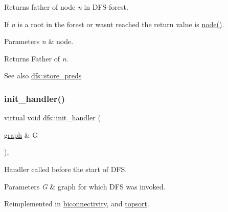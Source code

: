 Returns father of node {\itshape n} in D\+F\+S-\/forest. 

If {\itshape n} is a root in the forest or wasn\textquotesingle{}t reached the return value is {\ttfamily \mbox{\hyperlink{classnode}{node()}}}.


\begin{DoxyParams}{Parameters}
{\em n} & node. \\
\hline
\end{DoxyParams}
\begin{DoxyReturn}{Returns}
Father of {\itshape n}. 
\end{DoxyReturn}
\begin{DoxySeeAlso}{See also}
\mbox{\hyperlink{classdfs_a7043f46eb3887cbcbb1391fc783407a4}{dfs\+::store\+\_\+preds}} 
\end{DoxySeeAlso}
\mbox{\label{classdfs_acc82574cd42ab8256e685374bee5fabb}} 
\subsubsection{\texorpdfstring{init\+\_\+handler()}{init\_handler()}}
{\footnotesize\ttfamily virtual void dfs\+::init\+\_\+handler (\begin{DoxyParamCaption}\item[{\mbox{\hyperlink{classgraph}{graph}} \&}]{G }\end{DoxyParamCaption})\hspace{0.3cm}{\ttfamily [inline]}, {\ttfamily [virtual]}}



Handler called before the start of D\+FS. 


\begin{DoxyParams}{Parameters}
{\em G} & graph for which D\+FS was invoked. \\
\hline
\end{DoxyParams}


Reimplemented in \mbox{\hyperlink{classbiconnectivity_acdde9c069598de57bb78417f85d82bc7}{biconnectivity}}, and \mbox{\hyperlink{classtopsort_a21aaf28fc280094ed43288e58d8e3ae1}{topsort}}.

\mbox{\label{classdfs_a8071fc4e82deff7ceb2790cd4eb42280}} 
